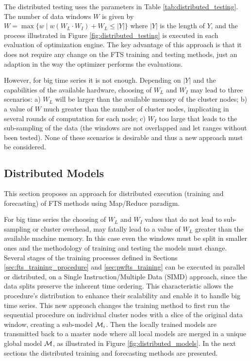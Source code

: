 The distributed testing uses the parameters in Table \ref{tab:distributed_testing}. The number of data windows $W$ is given by $W = \max \{w\; |\; w(W_L\cdot W_I) + W_L \leq |Y| \}$ where $|Y|$ is the length of $Y$, and the process illustrated in Figure \ref{fig:distributed_testing} is executed in each evaluation of optimization engine. The key advantage of this approach is that it does not require any change on the FTS training and testing methods, just an adaption in the way the optimizer performs the evaluations. 

However, for big time series it is not enough. Depending on $|Y|$ and the capabilities of the available hardware, choosing of $W_L$ and $W_I$ may lead to three scenarios: a) $W_L$ will be larger than the available memory of the cluster nodes; b) a value of $W$ much greater than the number of cluster nodes, implicating in several rounds of computation for each node; c) $W_I$ too large that leads to the sub-sampling of the data (the windows are not overlapped and let ranges without been tested). None of these scenarios is desirable and thus a new approach must be considered.

\subsection{Distributed Models}
\label{sec:distributed_models}

This section proposes an approach for distributed execution (training and forecasting) of FTS methods using Map/Reduce paradigm.

For big time series the choosing of $W_L$ and $W_I$ values that do not lead to sub-sampling or cluster overhead, may fatally lead to a value of $W_L$ greater than the available machine memory. In this case even the windows must be split in smaller ones and the methodology of training and testing the models must change. Several stages of the training processes defined in Sections \ref{sec:fts_training_procedure} and  \ref{sec:pwfts_training} can be executed in parallel or distributed, on a Single Instruction/Multiple Data (SIMD) approach, since the data splits preserve the inherent time ordering. This characteristic allows the procedure's distribution to enhance their scalability and enable it to handle big time series.
\index{$\model$}
This new approach changes the training method to first run the sequential procedure on individual cluster nodes with a slice of the original data window, creating a sub-model $\mathcal{M}_i$. Then the locally trained models are transmitted back to a master node where all local models are merged in a unique global model $\model$, as illustrated in Figure \ref{fig:distributed_models}. In the next sections the distributed training and forecasting methods are presented.

